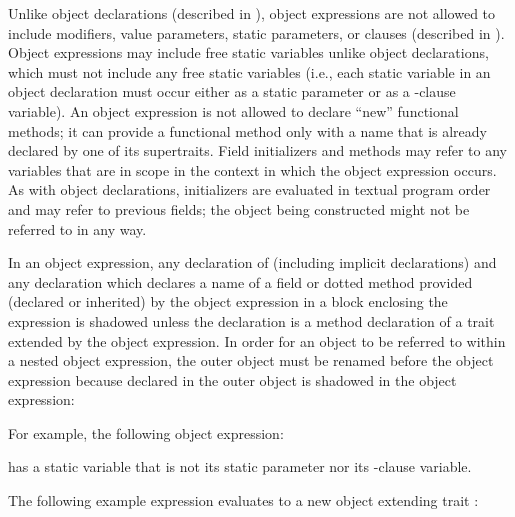 Unlike object declarations (described in ),
object expressions are not allowed to include
modifiers,
value parameters,
static parameters, or
 clauses (described in ).
Object expressions may include free static variables
unlike object declarations, which must
not include any free static variables (i.e., each static variable in
an object declaration must occur
either as a static parameter
or as a -clause variable).
An object expression is not allowed to declare ``new''
functional methods; it can provide a functional method
only with a name that is already declared by one of its supertraits.
Field initializers and methods may refer to any
variables that are in scope in the context in which the object
expression occurs.  As with object declarations, initializers are evaluated
in textual program order and may refer to previous fields; the object
being constructed might not be referred to in any way.


In an object expression,
any declaration of  (including implicit declarations)
and any declaration which declares a name of a field or dotted method provided
(declared or inherited) by the object expression
in a block enclosing the expression is shadowed
unless the declaration is a method declaration
of a trait extended by the object expression.
In order for an object to be referred to within a nested object expression,
the outer object must be renamed before the object expression
because  declared in the outer object
is shadowed in the object expression:




For example, the following object expression:

has a static variable  that is not its static parameter
nor its -clause variable.



The following example expression evaluates to a new object extending
trait :

